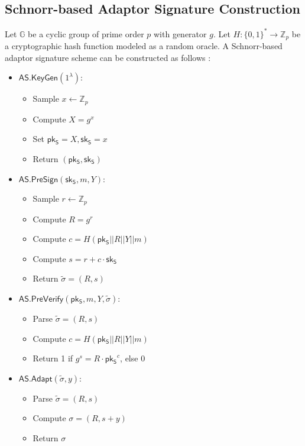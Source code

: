 \subsection{Schnorr-based Adaptor Signature Construction}\label{Appendix:Schnorr-based AS}
Let $\mathbb{G}$ be a cyclic group of prime order $p$ with generator $g$. Let $H: \{0,1\}^* \rightarrow \mathbb{Z}_p$ be a cryptographic hash function modeled as a random oracle. A Schnorr-based adaptor signature scheme can be constructed as follows \cite{GSS+24, ER22}:
\begin{itemize}
   \item $\mathsf{AS.KeyGen}(1^\lambda)$:
       \begin{itemize}
           \item Sample $x \leftarrow \mathbb{Z}_p$
           \item Compute $X = g^x$
           \item Set $\mathsf{pk_S}=X, \mathsf{sk_S}=x$
           \item Return $(\mathsf{pk_S}, \mathsf{sk_S})$
       \end{itemize}
       
   \item $\mathsf{AS.PreSign}(\mathsf{sk_S}, m, Y)$:
       \begin{itemize}
           \item Sample $r \leftarrow \mathbb{Z}_p$
           \item Compute $R = g^r$
           \item Compute $c = H(\mathsf{pk_S}||R || Y||m)$
           \item Compute $s = r + c \cdot \mathsf{sk_S}$
           \item Return $\widetilde{\sigma} = (R,s)$
       \end{itemize}
       
   \item $\mathsf{AS.PreVerify}(\mathsf{pk_S}, m, Y, \widetilde{\sigma})$:
       \begin{itemize}
           \item Parse $\widetilde{\sigma} = (R,s)$
           \item Compute $c = H(\mathsf{pk_S}||R || Y||m)$
           \item Return 1 if $g^s = R \cdot \mathsf{pk_S}^c$, else 0
       \end{itemize}
       
   \item $\mathsf{AS.Adapt}(\widetilde{\sigma}, y)$:
       \begin{itemize}
           \item Parse $\widetilde{\sigma} = (R,s)$
           \item Compute $\sigma = (R, s + y)$
           \item Return $\sigma$
       \end{itemize}
       

\end{itemize}
